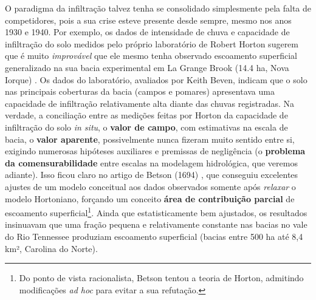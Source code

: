\documentclass[./main.tex]{subfiles}
\begin{document}
\par O paradigma da infiltração talvez tenha se consolidado simplesmente pela falta de competidores, pois a sua crise esteve presente desde sempre, mesmo nos anos 1930 e 1940. Por exemplo, os dados de intensidade de chuva e capacidade de infiltração do solo medidos pelo próprio laboratório de Robert Horton sugerem que é muito \textit{improvável} que ele mesmo tenha observado escoamento superficial generalizado na sua bacia experimental em La Grange Brook (14.4 ha, Nova Iorque) \cite{Beven2004c}. Os dados do laboratório, avaliados por Keith Beven, indicam que o solo nas principais coberturas da bacia (campos e pomares) apresentava uma capacidade de infiltração relativamente alta diante das chuvas registradas. Na verdade, a conciliação entre as medições feitas por Horton da capacidade de infiltração do solo \textit{in situ}, o \textbf{valor de campo}, com estimativas na escala de bacia, o \textbf{valor aparente}, possivelmente nunca fizeram muito sentido entre si, exigindo numerosas hipóteses auxiliares e premissas de negligência (o \textbf{problema da comensurabilidade} entre escalas na modelagem hidrológica, que veremos adiante). Isso ficou claro no artigo de Betson (1694) \cite{Betson1964}, que conseguiu excelentes ajustes de um modelo conceitual aos dados observados somente após \textit{relaxar} o modelo Hortoniano, forçando um conceito \textbf{área de contribuição parcial} de escoamento superficial\footnote{Do ponto de vista racionalista, Betson tentou  a teoria de Horton, admitindo modificações \textit{ad hoc} para evitar a sua refutação.}. Ainda que estatisticamente bem ajustados, os resultados insinuavam que uma fração pequena e relativamente constante nas bacias no vale do Rio Tennessee produziam escoamento superficial (bacias entre 500 ha até 8,4 km², Carolina do Norte).
\end{document}
